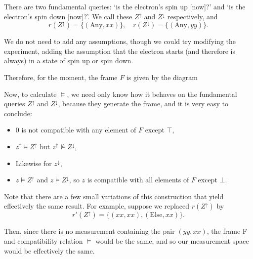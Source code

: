 \documentclass{article}
\theoremstyle{definition}
\theoremstyle{plain}
\begin{document}
There are two fundamental queries: `is the electron's spin up [now]?' and `is the electron's spin down [now]?'. We call these $Z^\uparrow$ and $Z^\downarrow$ respectively, and
\begin{equation}
r(Z^\uparrow) = \{(\text{Any}, xx)\}, \quad r(Z^\downarrow) = \{(\text{Any}, yy)\}.
\end{equation}

We do not need to add any assumptions, though we could try modifying the experiment, adding the assumption that the electron starts (and therefore is always) in a state of spin up or spin down.

Therefore, for the moment, the frame $F$ is given by the diagram
\begin{center}
\end{center}

Now, to calculate $\vDash$, we need only know how it behaves on the fundamental queries $Z^\uparrow$ and $Z^\downarrow$, because they generate the frame, and it is very easy to conclude:
\begin{itemize}
\item $0$ is not compatible with any element of $F$ except $\top$,
\item $z^\uparrow \vDash Z^\uparrow$ but $z^\uparrow \nvDash Z^\downarrow$,
\item Likewise for $z^\downarrow$,
\item $z \vDash Z^\uparrow$ and $z \vDash Z^\downarrow$, so $z$ is compatible with all elements of $F$ except $\bot$.
\end{itemize}

Note that there are a few small variations of this construction that yield effectively the same result. For example, suppose we replaced $r(Z^\uparrow)$ by
\begin{equation}
r'(Z^\uparrow) = \{(xx,xx), (\text{Else}, xx)\}.
\end{equation}

Then, since there is no measurement containing the pair $(yy,xx)$, the frame F and compatibility relation $\vDash$ would be the same, and so our measurement space would be effectively the same.
\end{document}

